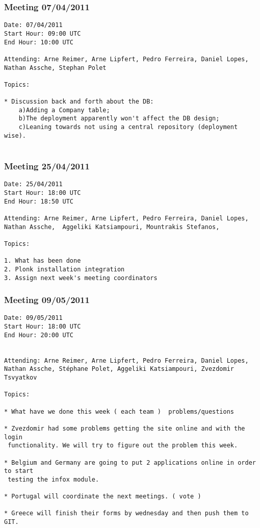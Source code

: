 \vspace{50px}
\subsubsection{Meeting 07/04/2011}
\normalsize
\begin{verbatim}
Date: 07/04/2011 
Start Hour: 09:00 UTC
End Hour: 10:00 UTC

Attending: Arne Reimer, Arne Lipfert, Pedro Ferreira, Daniel Lopes,
Nathan Assche, Stephan Polet

Topics:

* Discussion back and forth about the DB:
	a)Adding a Company table;
	b)The deployment apparently won't affect the DB design;
	c)Leaning towards not using a central repository (deployment wise).
		
\end{verbatim}

\vspace{50px}
\subsubsection{Meeting 25/04/2011}
\normalsize
\begin{verbatim}
Date: 25/04/2011
Start Hour: 18:00 UTC
End Hour: 18:50 UTC

Attending: Arne Reimer, Arne Lipfert, Pedro Ferreira, Daniel Lopes,
Nathan Assche,  Aggeliki Katsiampouri, Mountrakis Stefanos,

Topics:

1. What has been done
2. Plonk installation integration
3. Assign next week's meeting coordinators
\end{verbatim}

\vspace{50px}
\subsubsection{Meeting 09/05/2011}
\normalsize
\begin{verbatim}
Date: 09/05/2011
Start Hour: 18:00 UTC
End Hour: 20:00 UTC


Attending: Arne Reimer, Arne Lipfert, Pedro Ferreira, Daniel Lopes,
Nathan Assche, Stéphane Polet, Aggeliki Katsiampouri, Zvezdomir Tsvyatkov

Topics:

* What have we done this week ( each team )  problems/questions
    
* Zvezdomir had some problems getting the site online and with the login
 functionality. We will try to figure out the problem this week.

* Belgium and Germany are going to put 2 applications online in order to start
 testing the infox module.

* Portugal will coordinate the next meetings. ( vote )

* Greece will finish their forms by wednesday and then push them to GIT.
\end{verbatim}

